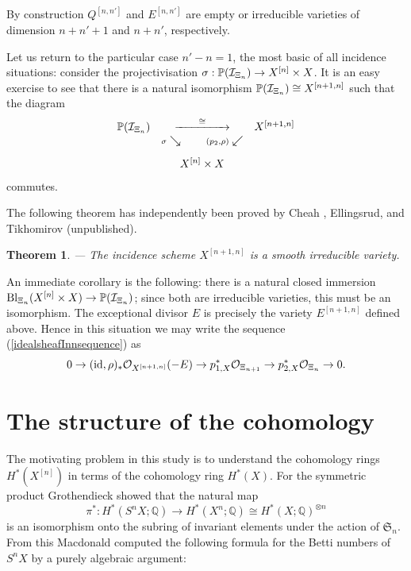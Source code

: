 \documentclass[twoside,11pt]{article}
\newtheorem{theorem}{Theorem}[section]
\newcommand{\beeq}[1]{\begin{eqnarray}\label{#1}}
\newcommand{\eneq}{\end{eqnarray}}
\newcommand{\ki}{{\cal I}}
\newcommand{\ko}{{\cal O}}
\newcommand{\IP}{{\mathbb P}}
\newcommand{\IQ}{{\mathbb Q}}
\newcommand{\gothS}{{\mathfrak S}}
\newcommand{\isom}{\cong}
\newcommand{\tensor}{\otimes}
\newcommand{\blowup}[2]{{\rm Bl}_{#1}{(#2})}
\newcommand{\id}{{\rm id}}
\newcommand{\lra}{\longrightarrow}
\newcommand{\ses}[3]{0\rightarrow#1\rightarrow#2
   \rightarrow#3\rightarrow0}
\newcommand{\verylongrightarrow}[1]{\raisebox{0mm}[0.9ex][0ex]{\hbox to #1{\rightarrowfill}}}
\newcommand{\rpfeil}[2]{\stackrel{#2}{\verylongrightarrow{#1}}}
\begin{document}
By construction $Q^{[n,n']}$ and $E^{[n,n']}$ are empty or irreducible varieties
of dimension $n+n'+1$ and $n+n'$, respectively.

Let us return to the particular case $n'-n=1$, the most basic of all incidence
situations: consider the projectivisation $\sigma:\IP(\ki_{\Xi_n})\to X^{[n]}\times X$. It is an easy exercise to see that there is a natural isomorphism $\IP(\ki_{\Xi_n})\isom X^{[n+1,n]}$ such that the diagram
$$\begin{array}{ccc}
\IP(\ki_{\Xi_n})&\rpfeil{5em}{\isom}&X^{[n+1,n]}\\
&{\scriptstyle\sigma}\searrow\quad\quad{\scriptstyle (p_2,\rho)}\swarrow\\[2ex]
&X^{[n]}\times X
\end{array}
$$
commutes.

The following theorem has independently been proved by Cheah \cite{CheahSmooth}, Ellings\-rud, and Tikhomirov (unpublished).

\begin{theorem}--- The incidence scheme $X^{[n+1,n]}$ is a smooth ir\-re\-duc\-ible variety.
\end{theorem}

An immediate corollary is the following: there is a natural closed immersion
$\blowup{\Xi_n}{X^{[n]}\times X}\to \IP(\ki_{\Xi_n})$; since both are 
irreducible varieties, this must be an isomorphism. The exceptional divisor 
$E$ is precisely the variety $E^{[n+1,n]}$ defined above. Hence in this situation we may write the sequence (\ref{idealsheafInnsequence}) as
\beeq{idealsheafgleichOminusE}
\ses{(\id,\rho)_*\ko_{X^{[n+1,n]}}(-E)}{p_{1,X}^*\ko_{\Xi_{n+1}}}{p_{2,X}^*
\ko_{\Xi_n}}.
\eneq
 

\section{The structure of the cohomology}\label{TheStructure}


The motivating problem in this study is to understand
the cohomology rings $H^*(X^{[n]})$ in terms of the cohomology ring $H^*(X)$.
For the symmetric product Grothendieck \cite{GrothSymmProd} showed that the 
natural map
$$\pi^*:H^*(S^nX;\IQ)\lra H^*(X^n;\IQ)\isom H^*(X;\IQ)^{\tensor n}$$
is an isomorphism onto the subring of invariant elements under the action of
$\gothS_n$. From this Macdonald \cite{Macdonald} computed the following formula for the 
Betti numbers of $S^nX$ by a purely algebraic argument:
\end{document}
